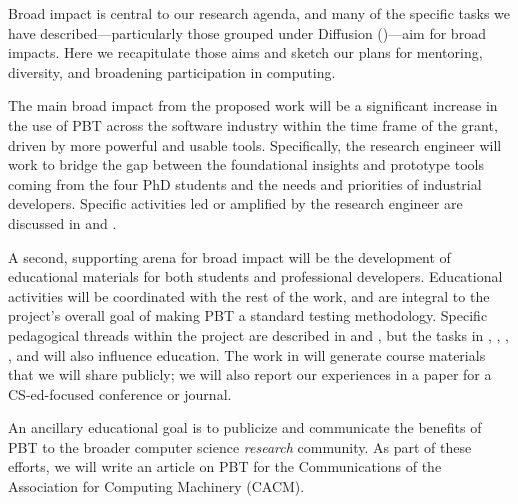 



Broad impact is central to our research agenda, and many of the specific
tasks we have described---particularly those grouped under Diffusion
()---aim for broad impacts.  Here we
recapitulate those aims and sketch our plans for mentoring, diversity,
and broadening participation in computing.

\smallskip
{} The main broad impact from the
proposed work will be a significant increase in the use of PBT across
the software industry within the time frame of the grant, driven
by more powerful and usable tools. Specifically, the research engineer will work to
bridge the gap between the foundational insights and prototype tools
coming from the four PhD students and the needs and priorities of
industrial developers.
Specific activities led or amplified by the research engineer are discussed in
 and .

\smallskip
{}
%
A second, supporting arena for broad impact will be the
development of educational materials for both students and
professional developers. Educational activities will be
coordinated with the rest of the work, and are integral to the
project's overall goal of making PBT a standard testing methodology.
Specific pedagogical
threads within the project are described in  and , but the
tasks in , ,
, , and
 will also influence education. The
work in  will generate course materials that we will
share publicly; we will also report our experiences in a paper for a
CS-ed-focused conference or journal.

An ancillary educational goal is to
publicize and communicate the benefits of PBT to the broader computer science
{\em research} community. As part of these efforts, we will write an article on PBT
for the Communications of the Association for Computing Machinery
(CACM).

